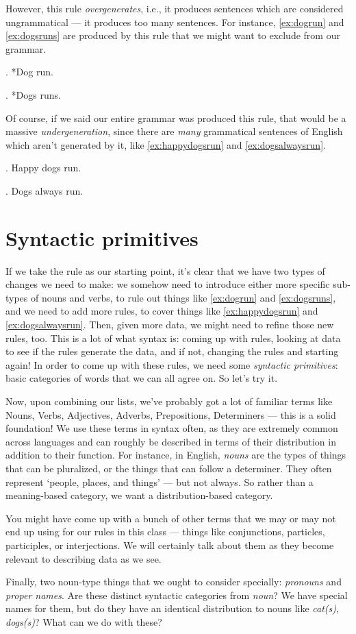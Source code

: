 
However, this rule \emph{overgenerates}, i.e., it produces sentences which are considered ungrammatical --- it produces too many sentences. For instance, \ref{ex:dogrun} and \ref{ex:dogsruns} are produced by this rule that we might want to exclude from our grammar.

\ex. *Dog run. \label{ex:dogrun}

\ex. *Dogs runs. \label{ex:dogsruns}

Of course, if we said our entire grammar was produced this rule, that would be a massive \emph{undergeneration}, since there are \emph{many} grammatical sentences of English which aren't generated by it, like \ref{ex:happydogsrun} and \ref{ex:dogsalwaysrun}.

\ex. Happy dogs run. \label{ex:happydogsrun}

\ex. Dogs always run. \label{ex:dogsalwaysrun}

\section{Syntactic primitives}

If we take the rule as our starting point, it's clear that we have two types of changes we need to make: we somehow need to introduce either more specific sub-types of nouns and verbs, to rule out things like \ref{ex:dogrun} and \ref{ex:dogsruns}, and we need to add more rules, to cover things like \ref{ex:happydogsrun} and \ref{ex:dogsalwaysrun}. Then, given more data, we might need to refine those new rules, too. This is a lot of what syntax is: coming up with rules, looking at data to see if the rules generate the data, and if not, changing the rules and starting again! In order to come up with these rules, we need some \emph{syntactic primitives}: basic categories of words that we can all agree on. So let's try it.

Now, upon combining our lists, we've probably got a lot of familiar terms like Nouns, Verbs, Adjectives, Adverbs, Prepositions, Determiners --- this is a solid foundation! We use these terms in syntax often, as they are extremely common across languages and can roughly be described in terms of their distribution in addition to their function. For instance, in English, \emph{nouns} are the types of things that can be pluralized, or the things that can follow a determiner. They often represent `people, places, and things' --- but not always. So rather than a meaning-based category, we want a distribution-based category.

You might have come up with a bunch of other terms that we may or may not end up using for our rules in this class --- things like conjunctions, particles, participles, or interjections. We will certainly talk about them as they become relevant to describing data as we see.

Finally, two noun-type things that we ought to consider specially: \emph{pronouns} and \emph{proper names}. Are these distinct syntactic categories from \emph{noun}? We have special names for them, but do they have an identical distribution to nouns like \emph{cat(s)}, \emph{dogs(s)}? What can we do with these?

